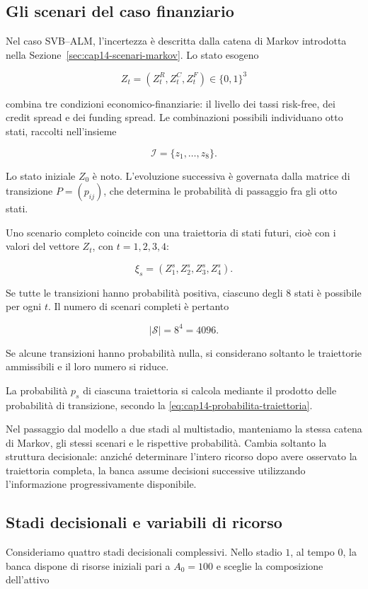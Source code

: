 \subsection{Gli scenari del caso finanziario}

Nel caso SVB--ALM, l'incertezza \`e descritta
dalla catena di Markov introdotta nella
Sezione~\ref{sec:cap14-scenari-markov}.
Lo stato esogeno

\[
Z_t=(Z_t^R,Z_t^C,Z_t^F)\in\{0,1\}^3
\]

\noindent combina tre condizioni economico-finanziarie:
il livello dei tassi risk-free, dei credit spread
e dei funding spread. Le combinazioni possibili
individuano otto stati, raccolti nell'insieme

\[
\mathcal I=\{z_1,\ldots,z_8\}.
\]

Lo stato iniziale $Z_0$ \`e noto.
L'evoluzione successiva \`e governata
dalla matrice di transizione $P=(p_{ij})$,
che determina le probabilit\`a di passaggio
fra gli otto stati.

Uno scenario completo coincide con una traiettoria
di stati futuri, cioè con i valori del vettore $Z_t$, con $t=1,2,3,4$:

\[
\xi_s=(Z_1^s,Z_2^s,Z_3^s,Z_4^s).
\]

Se tutte le transizioni hanno probabilit\`a
positiva, ciascuno degli 8 stati è possibile per ogni $t$. Il numero
di scenari completi \`e pertanto

\[
|\mathcal S|=8^4=4096.
\]

Se alcune transizioni hanno probabilit\`a
nulla, si considerano soltanto le traiettorie
ammissibili e il loro numero si riduce.

La probabilit\`a $p_s$ di ciascuna traiettoria
si calcola mediante il prodotto delle
probabilit\`a di transizione, secondo
la \eqref{eq:cap14-probabilita-traiettoria}.

Nel passaggio dal modello a due stadi
al multistadio, manteniamo la stessa
catena di Markov, gli stessi scenari
e le rispettive probabilit\`a.
Cambia soltanto la struttura decisionale:
anzich\'e determinare l'intero ricorso
dopo avere osservato la traiettoria completa,
la banca assume decisioni successive
utilizzando l'informazione progressivamente
disponibile.

\subsection{Stadi decisionali e variabili di ricorso}

Consideriamo quattro stadi decisionali
complessivi. Nello stadio $1$, al tempo $0$, la banca dispone di risorse
iniziali pari a $A_0=100$ e sceglie la composizione dell'attivo

